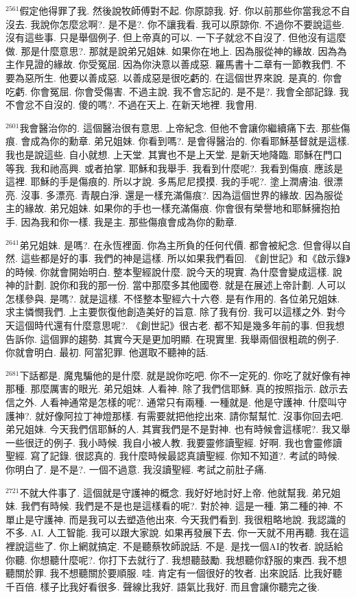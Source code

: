 \documentclass{book}
\begin{document}
$^{2561}$假定他得罪了我.
然後說牧師傅對不起.
你原諒我.
好.
你以前那些你當我忿不自沒去.
我說你怎麼忿啊?.
是不是?.
你不讓我看.
我可以原諒你.
不過你不要說這些.
沒有這些事.
只是舉個例子.
但上帝真的可以.
一下子就忿不自沒了.
但他沒有這麼做.
那是什麼意思?.
那就是說弟兄姐妹.
如果你在地上.
因為服從神的緣故.
因為為主作見證的緣故.
你受冤屈.
因為你決意以善成惡.
羅馬書十二章有一節教我們.
不要為惡所生.
他要以善成惡.
以善成惡是很吃虧的.
在這個世界來說.
是真的.
你會吃虧.
你會冤屈.
你會受傷害.
不過主說.
我不會忘記的.
是不是?.
我會全部記錄.
我不會忿不自沒的.
傻的嗎?.
不過在天上.
在新天地裡.
我會用.

$^{2601}$我會醫治你的.
這個醫治很有意思.
上帝紀念.
但他不會讓你繼續痛下去.
那些傷痕.
會成為你的勳章.
弟兄姐妹.
你看到嗎?.
是會得醫治的.
你看耶穌基督就是這樣.
我也是說這些.
自小就想.
上天堂.
其實也不是上天堂.
是新天地降臨.
耶穌在門口等我.
我和祂高興.
或者拍掌.
耶穌和我舉手.
我看到什麼呢?.
我看到傷痕.
應該是這裡.
耶穌的手是傷痕的.
所以才說.
多馬尼尼摸摸.
我的手呢?.
塗上潤膚油.
很漂亮.
沒事.
多漂亮.
青靚白淨.
還是一樣充滿傷痕?.
因為這個世界的緣故.
因為服從主的緣故.
弟兄姐妹.
如果你的手也一樣充滿傷痕.
你會很有榮譽地和耶穌擁抱拍手.
因為我和你一樣.
我是主.
那些傷痕會成為你的勳章.

$^{2641}$弟兄姐妹.
是嗎?.
在永恆裡面.
你為主所負的任何代價.
都會被紀念.
但會得以自然.
這些都是好的事.
我們的神是這樣.
所以如果我們看回.
《創世記》和《啟示錄》的時候.
你就會開始明白.
整本聖經說什麼.
說今天的現實.
為什麼會變成這樣.
說神的計劃.
說你和我的那一份.
當中那麼多其他國卷.
就是在展述上帝計劃.
人可以怎樣參與.
是嗎?.
就是這樣.
不怪整本聖經六十六卷.
是有作用的.
各位弟兄姐妹.
求主憐憫我們.
上主要恢復他創造美好的旨意.
除了我有份.
我可以這樣之外.
對今天這個時代還有什麼意思呢?.
《創世記》很古老.
都不知是幾多年前的事.
但我想告訴你.
這個罪的趨勢.
其實今天是更加明顯.
在現實里.
我舉兩個很粗疏的例子.
你就會明白.
最初.
阿當犯罪.
他選取不聽神的話.

$^{2681}$下話都是.
魔鬼騙他的是什麼.
就是說你吃吧.
你不一定死的.
你吃了就好像有神那種.
那麼厲害的眼光.
弟兄姐妹.
人看神.
除了我們信耶穌.
真的按照指示.
啟示去信之外.
人看神通常是怎樣的呢?.
通常只有兩種.
一種就是.
他是守護神.
什麼叫守護神?.
就好像阿拉丁神燈那樣.
有需要就把他挖出來.
請你幫幫忙.
沒事你回去吧.
弟兄姐妹.
今天我們信耶穌的人.
其實我們是不是對神.
也有時候會這樣呢?.
我又舉一些很迂的例子.
我小時候.
我自小被人教.
我要靈修讀聖經.
好啊.
我也會靈修讀聖經.
寫了記錄.
很認真的.
我什麼時候最認真讀聖經.
你知不知道?.
考試的時候.
你明白了.
是不是?.
一個不過意.
我沒讀聖經.
考試之前肚子痛.

$^{2721}$不就大件事了.
這個就是守護神的概念.
我好好地討好上帝.
他就幫我.
弟兄姐妹.
我們有時候.
我們是不是也是這樣看的呢?.
對於神.
這是一種.
第二種的神.
不單止是守護神.
而是我可以去塑造他出來.
今天我們看到.
我很粗略地說.
我認識的不多.
AI.
人工智能.
我可以跟大家說.
如果再發展下去.
你一天就不用再聽.
我在這裡說這些了.
你上網就搞定.
不是聽蔡牧師說話.
不是.
是找一個AI的牧者.
說話給你聽.
你想聽什麼呢?.
你打下去就行了.
我想聽鼓勵.
我想聽你舒服的東西.
我不想聽關於罪.
我不想聽關於要順服.
哇.
肯定有一個很好的牧者.
出來說話.
比我好聽千百倍.
樣子比我好看很多.
聲線比我好.
語氣比我好.
而且會讓你聽完之後.
\end{document}
